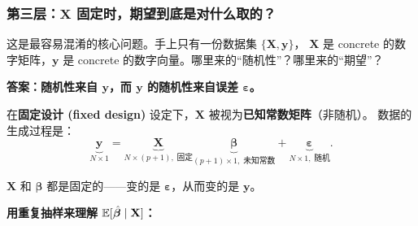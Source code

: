 \subsubsection{第三层：$\mathbf{X}$ 固定时，期望到底是对什么取的？}

这是最容易混淆的核心问题。手上只有一份数据集 $\{\mathbf{X}, \mathbf{y}\}$，
$\mathbf{X}$ 是 concrete 的数字矩阵，$\mathbf{y}$ 是 concrete 的数字向量。哪里来的``随机性''？哪里来的``期望''？

\textbf{答案：随机性来自 $\mathbf{y}$，而 $\mathbf{y}$ 的随机性来自误差 $\bm{\varepsilon}$。}

在\textbf{固定设计 (fixed design)} 设定下，$\mathbf{X}$ 被视为\textbf{已知常数矩阵}（非随机）。
数据的生成过程是：
\[
    \underbrace{\mathbf{y}}_{N \times 1}
    = \underbrace{\mathbf{X}}_{N \times (p+1),\;\text{固定}}
      \underbrace{\bm{\beta}}_{(p+1)\times 1,\;\text{未知常数}}
    + \underbrace{\bm{\varepsilon}}_{N \times 1,\;\text{随机}}.
\]

$\mathbf{X}$ 和 $\bm{\beta}$ 都是固定的——变的是 $\bm{\varepsilon}$，从而变的是 $\mathbf{y}$。

\bigskip
\noindent
\textbf{用重复抽样来理解 $\mathbb{E}[\hat{\bm{\beta}} \mid \mathbf{X}]$：}

\begin{center}
\end{center}

